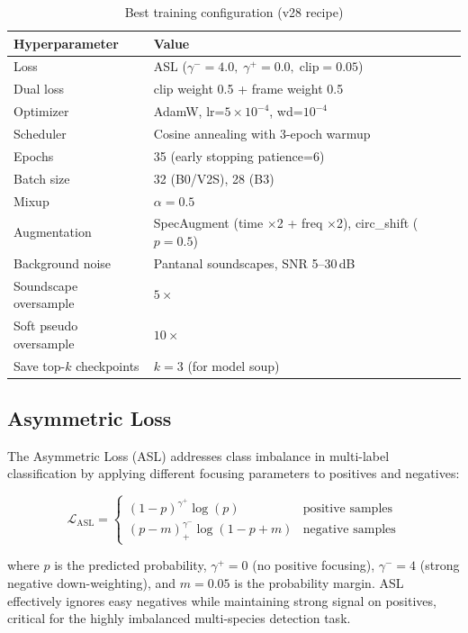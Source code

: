 \documentclass[11pt,a4paper]{article}
\begin{document}
\begin{table}[H]
\centering
\caption{Best training configuration (v28 recipe)}
\begin{tabular}{ll}
\toprule
\textbf{Hyperparameter} & \textbf{Value} \\
\midrule
Loss & ASL ($\gamma^-=4.0,\; \gamma^+=0.0,\; \text{clip}=0.05$) \\
Dual loss & clip weight 0.5 + frame weight 0.5 \\
Optimizer & AdamW, lr=$5\times10^{-4}$, wd=$10^{-4}$ \\
Scheduler & Cosine annealing with 3-epoch warmup \\
Epochs & 35 (early stopping patience=6) \\
Batch size & 32 (B0/V2S), 28 (B3) \\
Mixup & $\alpha=0.5$ \\
Augmentation & SpecAugment (time $\times$2 + freq $\times$2), circ\_shift ($p=0.5$) \\
Background noise & Pantanal soundscapes, SNR 5--30\,dB \\
Soundscape oversample & $5\times$ \\
Soft pseudo oversample & $10\times$ \\
Save top-$k$ checkpoints & $k=3$ (for model soup) \\
\bottomrule
\end{tabular}
\end{table}

\subsection{Asymmetric Loss}

The Asymmetric Loss (ASL) \cite{ridnik2021asymmetric} addresses class imbalance in
multi-label classification by applying different focusing parameters to positives and negatives:

\[
\mathcal{L}_{\text{ASL}} =
\begin{cases}
(1 - p)^{\gamma^+} \log(p) & \text{positive samples} \\
(p - m)^{\gamma^-}_{+} \log(1 - p + m) & \text{negative samples}
\end{cases}
\]

where $p$ is the predicted probability, $\gamma^+=0$ (no positive focusing),
$\gamma^-=4$ (strong negative down-weighting), and $m=0.05$ is the probability margin.
ASL effectively ignores easy negatives while maintaining strong signal on positives,
critical for the highly imbalanced multi-species detection task.
\end{document}
